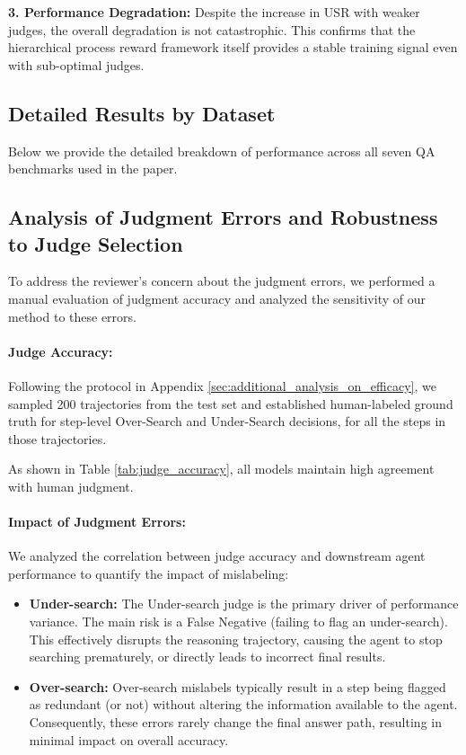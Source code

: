 \documentclass{article}
\begin{document}
\textbf{3. Performance Degradation:} Despite the increase in USR with weaker judges, the overall degradation is not catastrophic. This confirms that the hierarchical process reward framework itself provides a stable training signal even with sub-optimal judges.

\subsection{Detailed Results by Dataset}
Below we provide the detailed breakdown of performance across all seven QA benchmarks used in the paper.


\subsection{Analysis of Judgment Errors and Robustness to Judge Selection}
To address the reviewer's concern about the judgment errors, we performed a manual evaluation of judgment accuracy and analyzed the sensitivity of our method to these errors.

\paragraph{Judge Accuracy:} Following the protocol in Appendix \ref{sec:additional_analysis_on_efficacy}, we sampled 200 trajectories from the test set and established human-labeled ground truth for step-level Over-Search and Under-Search decisions, for all the steps in those trajectories.


As shown in Table \ref{tab:judge_accuracy}, all models maintain high agreement with human judgment.

\paragraph{Impact of Judgment Errors:} We analyzed the correlation between judge accuracy and downstream agent performance to quantify the impact of mislabeling:
\begin{itemize}
 \item \textbf{Under-search:} The Under-search judge is the primary driver of performance variance. The main risk is a False Negative (failing to flag an under-search). This effectively disrupts the reasoning trajectory, causing the agent to stop searching prematurely, or directly leads to incorrect final results.
 \item \textbf{Over-search:} Over-search mislabels typically result in a step being flagged as redundant (or not) without altering the information available to the agent. Consequently, these errors rarely change the final answer path, resulting in minimal impact on overall accuracy.
\end{itemize}
\end{document}
